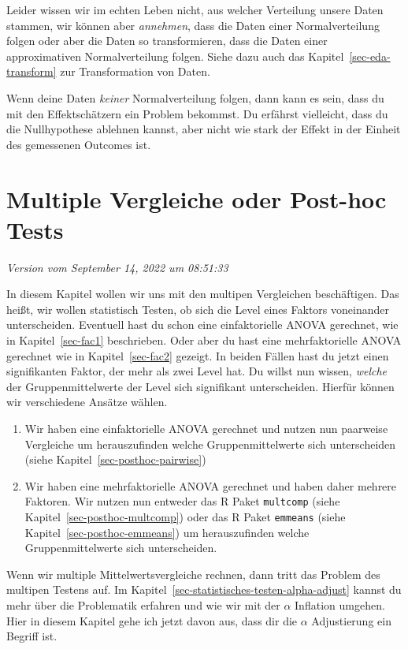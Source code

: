 \documentclass[
  letterpaper,
]{scrbook}
\providecommand{\tightlist}{%
  \setlength{\itemsep}{0pt}\setlength{\parskip}{0pt}}\usepackage{longtable,booktabs,array}
\begin{document}
Leider wissen wir im echten Leben nicht, aus welcher Verteilung unsere
Daten stammen, wir können aber \emph{annehmen}, dass die Daten einer
Normalverteilung folgen oder aber die Daten so transformieren, dass die
Daten einer approximativen Normalverteilung folgen. Siehe dazu auch das
Kapitel~\ref{sec-eda-transform} zur Transformation von Daten.

Wenn deine Daten \emph{keiner} Normalverteilung folgen, dann kann es
sein, dass du mit den Effektschätzern ein Problem bekommst. Du erfährst
vielleicht, dass du die Nullhypothese ablehnen kannst, aber nicht wie
stark der Effekt in der Einheit des gemessenen Outcomes ist.

\hypertarget{sec-posthoc}{%
\chapter{Multiple Vergleiche oder Post-hoc Tests}\label{sec-posthoc}}

\emph{Version vom September 14, 2022 um 08:51:33}

In diesem Kapitel wollen wir uns mit den multipen Vergleichen
beschäftigen. Das heißt, wir wollen statistisch Testen, ob sich die
Level eines Faktors voneinander unterscheiden. Eventuell hast du schon
eine einfaktorielle ANOVA gerechnet, wie in Kapitel~\ref{sec-fac1}
beschrieben. Oder aber du hast eine mehrfaktorielle ANOVA gerechnet wie
in Kapitel~\ref{sec-fac2} gezeigt. In beiden Fällen hast du jetzt einen
signifikanten Faktor, der mehr als zwei Level hat. Du willst nun wissen,
\emph{welche} der Gruppenmittelwerte der Level sich signifikant
unterscheiden. Hierfür können wir verschiedene Ansätze wählen.

\begin{enumerate}
\def\labelenumi{\arabic{enumi})}
\tightlist
\item
  Wir haben eine einfaktorielle ANOVA gerechnet und nutzen nun paarweise
  Vergleiche um herauszufinden welche Gruppenmittelwerte sich
  unterscheiden (siehe Kapitel~\ref{sec-posthoc-pairwise})
\item
  Wir haben eine mehrfaktorielle ANOVA gerechnet und haben daher mehrere
  Faktoren. Wir nutzen nun entweder das R Paket \texttt{multcomp} (siehe
  Kapitel~\ref{sec-posthoc-multcomp}) oder das R Paket \texttt{emmeans}
  (siehe Kapitel~\ref{sec-posthoc-emmeans}) um herauszufinden welche
  Gruppenmittelwerte sich unterscheiden.
\end{enumerate}

Wenn wir multiple Mittelwertsvergleiche rechnen, dann tritt das Problem
des multipen Testens auf. Im
Kapitel~\ref{sec-statistisches-testen-alpha-adjust} kannst du mehr über
die Problematik erfahren und wie wir mit der \(\alpha\) Inflation
umgehen. Hier in diesem Kapitel gehe ich jetzt davon aus, dass dir die
\(\alpha\) Adjustierung ein Begriff ist.
\end{document}
